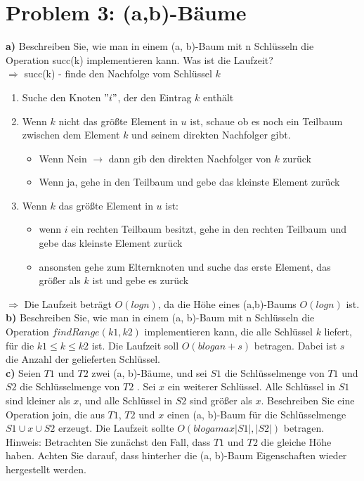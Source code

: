 \section*{Problem 3: (a,b)-Bäume} 

\textbf{a)} Beschreiben Sie, wie man in einem (a, b)-Baum mit n Schlüsseln die Operation succ(k) implementieren kann. Was ist die Laufzeit?\\

$\Rightarrow$ succ(k) - finde den Nachfolge vom Schlüssel $k$

\begin{enumerate}
\item Suche den Knoten $"i"$, der den Eintrag $k$ enthält
\item Wenn $k$ nicht das größte Element in $u$ ist, schaue ob es noch ein Teilbaum zwischen dem Element $k$ und seinem direkten Nachfolger gibt.
	\begin{itemize}
		\item Wenn Nein $\rightarrow$ dann gib den direkten Nachfolger von $k$ zurück
		\item Wenn ja, gehe in den Teilbaum und gebe das kleinste Element zurück
	\end{itemize}
\item Wenn $k$ das größte Element in $u$ ist:
	\begin{itemize}
		\item wenn $i$ ein rechten Teilbaum besitzt, gehe in den rechten Teilbaum und gebe das kleinste Element zurück
		\item ansonsten gehe zum Elternknoten und suche das erste Element, das größer als $k$ ist und gebe es zurück
	\end{itemize}
\end{enumerate}

$\Rightarrow$ Die Laufzeit beträgt $O(logn)$, da die Höhe eines (a,b)-Baums $O(logn)$ ist. \\



\noindent
\textbf{b)} Beschreiben Sie, wie man in einem (a, b)-Baum mit n Schlüsseln die Operation $findRange(k1 , k2)$ implementieren kann, die alle Schlüssel $k$ liefert, für die
$k1 \leq k \leq k2$ ist. Die Laufzeit soll $O(b loga n + s)$ betragen. Dabei ist $s$ die Anzahl der gelieferten Schlüssel.\\

\noindent
\textbf{c)} Seien $T1$ und $T2$ zwei (a, b)-Bäume, und sei $S1$ die Schlüsselmenge von $T1$ und $S2$ die Schlüsselmenge von $T2$ . Sei $x$ ein weiterer Schlüssel. Alle Schlüssel in $S1$ sind kleiner als $x$, und alle Schlüssel in $S2$ sind größer als $x$. Beschreiben Sie eine Operation join, die aus $T1$, $T2$ und $x$ einen (a, b)-Baum für die Schlüsselmenge $S1 \cup {x} \cup S2$ erzeugt. Die Laufzeit sollte $O(b loga max{|S1|, |S2|})$ betragen. Hinweis: Betrachten Sie zunächst den Fall, dass $T1$ und $T2$ die gleiche Höhe haben. Achten Sie darauf, dass hinterher die (a, b)-Baum Eigenschaften wieder hergestellt werden.